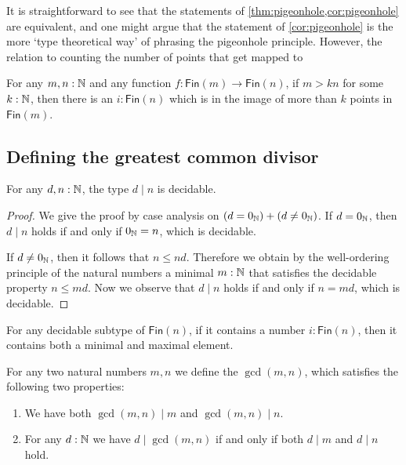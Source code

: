 It is straightforward to see that the statements of \cref{thm:pigeonhole,cor:pigeonhole} are equivalent, and one might argue that the statement of \cref{cor:pigeonhole} is the more `type theoretical way' of phrasing the pigeonhole principle. However, the relation to counting the number of points that get mapped to 

\begin{thm}\label{thm:generalized-pigeonhole}
  For any $m,n:{\mathbb{N}}$ and any function $f:\mathsf{Fin}(m)\to\mathsf{Fin}(n)$, if $m>kn$ for some $k:{\mathbb{N}}$, then there is an $i:\mathsf{Fin}(n)$ which is in the image of more than $k$ points in $\mathsf{Fin}(m)$. 
\end{thm}

\subsection{Defining the greatest common divisor}

\begin{lem}
  For any $d,n:{\mathbb{N}}$, the type $d\mid n$ is decidable.
\end{lem}

\begin{proof}
  We give the proof by case analysis on $(d=0_{{\mathbb{N}}})+(d\neq0_{{\mathbb{N}}})$. If $d=0_{{\mathbb{N}}}$, then $d\mid n$ holds if and only if $0_{{\mathbb{N}}}=n$, which is decidable.

  If $d\neq0_{{\mathbb{N}}}$, then it follows that $n\leq nd$. Therefore we obtain by the well-ordering principle of the natural numbers a minimal $m:{\mathbb{N}}$ that satisfies the decidable property $n\leq md$. Now we observe that $d\mid n$ holds if and only if $n=md$, which is decidable.
\end{proof}

\begin{lem}
  For any decidable subtype of $\mathsf{Fin}(n)$, if it contains a number $i:\mathsf{Fin}(n)$, then it contains both a minimal and maximal element.
\end{lem}

\begin{defn}
  For any two natural numbers $m,n$ we define the  $\gcd(m,n)$, which satisfies the following two properties:
  \begin{enumerate}
  \item We have both $\gcd(m,n)\mid m$ and $\gcd(m,n)\mid n$.
  \item For any $d:{\mathbb{N}}$ we have $d\mid \gcd(m,n)$ if and only if both $d\mid m$ and $d\mid n$ hold.
  \end{enumerate}
\end{defn}

